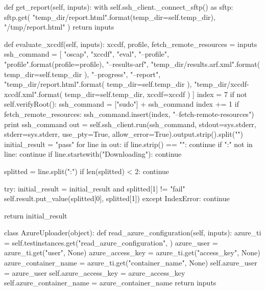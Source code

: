 \begin{python}
{    def get_report(self, inputs):
        with self.ssh_client._connect_sftp() as sftp:
            sftp.get(
                "{temp_dir}/report.html".format(temp_dir=self.temp_dir),
                "/tmp/report.html"
            )
        return inputs

    def evaluate_xccdf(self, inputs):
        xccdf, profile, fetch_remote_resources = inputs
        ssh_command = [
            "oscap",
            "xccdf",
            "eval",
            "--profile", "{profile}".format(profile=profile),
            "--results-arf", "{temp_dir}/results.arf.xml".format(
                temp_dir=self.temp_dir
            ),
            "--progress",
            "--report",
            "{temp_dir}/report.html".format(
                temp_dir=self.temp_dir
            ),
            "{temp_dir}/{xccdf}-xccdf.xml".format(
                temp_dir=self.temp_dir, xccdf=xccdf
            )
        ]
        index = 7
        if not self.verifyRoot():
            ssh_command = ["sudo"] + ssh_command
            index += 1
        if fetch_remote_resources:
            ssh_command.insert(index, "--fetch-remote-resources")
        print ssh_command
        out = self.ssh_client.run(ssh_command,
                                  stdout=sys.stderr,
                                  stderr=sys.stderr,
                                  use_pty=True,
                                  allow_error=True).output.strip().split("\n")
        initial_result = "pass"
        for line in out:
            if line.strip() == "":
                continue
            if ":" not in line:
                continue
            if line.startswith("Downloading"):
                continue

            splitted = line.split(":")
            if len(splitted) < 2:
                continue

            try:
                initial_result = initial_result and splitted[1] != "fail"
                self.result.put_value(splitted[0], splitted[1])
            except IndexError:
                continue

        return initial_result


class AzureUploader(object):
    def read_azure_configuration(self, inputs):
        azure_ti = self.testinstances.get("read_azure_configuration", {})
        azure_user = azure_ti.get("user", None)
        azure_access_key = azure_ti.get("access_key", None)
        azure_container_name = azure_ti.get("container_name", None)
        self.azure_user = azure_user
        self.azure_access_key = azure_access_key
        self.azure_container_name = azure_container_name
        return inputs

}
\end{python}

